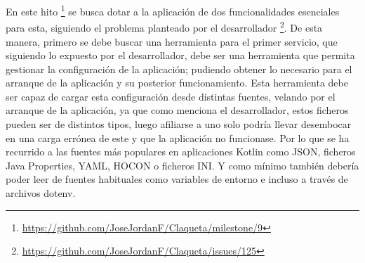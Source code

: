 En este hito \footnote{\url{https://github.com/JoseJordanF/Claqueta/milestone/9}} se busca dotar a la aplicación de
dos funcionalidades esenciales para esta, siguiendo el problema planteado por el desarrollador 
\footnote{\url{https://github.com/JoseJordanF/Claqueta/issues/125}}. De esta manera, primero se debe buscar una 
herramienta para el primer servicio, que siguiendo lo expuesto por el desarrollador, debe ser una herramienta que 
permita gestionar la configuración de la aplicación; pudiendo obtener lo necesario para el arranque de la aplicación 
y su posterior funcionamiento. Esta herramienta debe ser capaz de cargar esta configuración desde distintas fuentes, 
velando por el arranque de la aplicación, ya que como menciona el desarrollador, estos ficheros pueden ser de 
distintos tipos, luego afiliarse a uno solo podría llevar desembocar en una carga errónea de este y que la 
aplicación no funcionase. Por lo que se ha recurrido a las fuentes más populares en aplicaciones Kotlin 
\cite{popularConfig} como JSON\cite{JsonWiki}, ficheros Java Properties\cite{JProWiki}, YAML\cite{YmlWiki}, 
HOCON\cite{HoconWiki} o ficheros INI\cite{IniWiki}. Y como mínimo también debería poder leer de fuentes habituales 
como variables de entorno e incluso a través de archivos dotenv.

